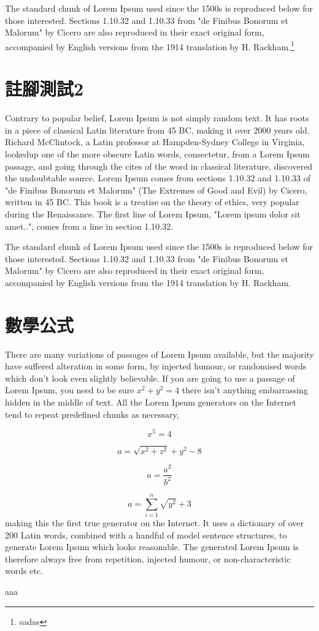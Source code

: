 \documentclass[12pt]{article}
\begin{document}
\begin{CJK*}{UTF8}{bsmi}
The standard chunk of Lorem Ipsum used since the 1500s is reproduced below for those interested. Sections 1.10.32 and 1.10.33 from "de Finibus Bonorum et Malorum" by Cicero are also reproduced in their exact original form, accompanied by English versions from the 1914 translation by H. Rackham.\footnote[12312]{sadas}

\section{註腳測試2}
\large Contrary to popular belief, Lorem Ipsum is not simply random text. It has roots in a piece of classical Latin literature from 45 BC, making it over 2000 years old. Richard McClintock, a Latin professor at Hampden-Sydney College in Virginia, looked\footnotemark up one of the more obscure Latin words, consectetur, from a Lorem Ipsum passage, and going through the cites of the word in classical literature, discovered the undoubtable source. Lorem Ipsum comes from sections 1.10.32 and 1.10.33 of "de Finibus Bonorum et Malorum" (The Extremes of Good and Evil) by Cicero, written in 45 BC. This book is a treatise on the theory of ethics\footnotemark, very popular during the Renaissance. The first line of Lorem Ipsum, "Lorem ipsum dolor sit amet..", comes from a line in section 1.10.32. 



The standard chunk of Lorem Ipsum used since the 1500s is reproduced below for those interested. Sections 1.10.32 and 1.10.33 from "de Finibus Bonorum et Malorum" by Cicero are also reproduced in their exact original form, accompanied by English versions from the 1914 translation by H. Rackham.


\section {數學公式}
There are many variations of passages of Lorem Ipsum available, but the majority have suffered alteration in some form, by injected humour, or randomised words which don't look even slightly believable. If you are going to use a passage of Lorem Ipsum, you need to be sure $ x^2+y^2=4$ %
there isn't anything embarrassing hidden in the middle of text. All the Lorem Ipsum generators on the Internet tend to repeat predefined chunks as necessary,

\[
  x^5=4 %
\]

\[
  a = \sqrt{x^2+z^2}+y^2-8 %
\]

\[
  a = \frac{a^2}{b^2} %
\]

\[
  a = \sum_{i=1}^{n}\sqrt{y^2}+3
\]
 making this the first true generator on the Internet. It uses a dictionary of over 200 Latin words, combined with a handful of model sentence structures, to generate Lorem Ipsum which looks reasonable. The generated Lorem Ipsum is therefore always free from repetition, injected humour, or non-characteristic words etc.


\pagebreak %
aaa

\end{CJK*}
\end{document}
